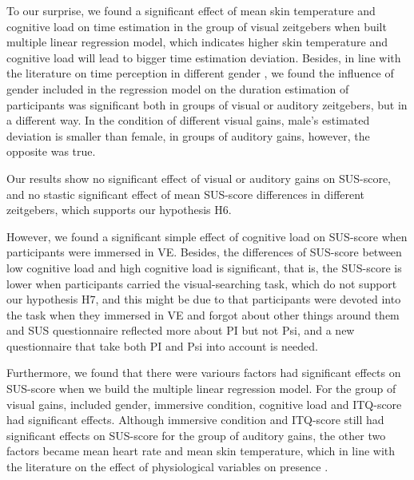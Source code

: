 \documentclass[sigconf]{acmart}
\begin{document}
To our surprise, we found a significant effect of mean skin temperature and cognitive load on time estimation in the group of visual zeitgebers when built multiple linear regression model, which indicates higher skin temperature and cognitive load will lead to bigger time estimation deviation. Besides, in line with the literature on time perception in different gender \cite{hancock1992effect}, we found the influence of gender included in the regression model on the duration estimation of participants was significant both in groups of visual or auditory zeitgebers, but in a different way. In the condition of different visual gains, male's estimated deviation is smaller than female, in groups of auditory gains, however, the opposite was true.

Our results show no significant effect of visual or auditory gains on SUS-score, and no stastic significant effect of mean SUS-score differences in different zeitgebers, which supports our hypothesis H6.

However, we found a significant simple effect of cognitive load on SUS-score when participants were immersed in VE. Besides, the differences of SUS-score between low cognitive load and high cognitive load is significant, that is, the SUS-score is lower when participants carried the visual-searching task, which do not support our hypothesis H7, and this might be due to that participants were devoted into the task when they immersed in VE and forgot about other things around them and SUS questionnaire reflected more about PI but not Psi, and a new questionnaire that take both PI and Psi into account is needed.

Furthermore, we found that there were variours factors had significant effects on SUS-score when we build the multiple linear regression model. For the group of visual gains, included gender, immersive condition, cognitive load and ITQ-score had significant effects. Although immersive condition and ITQ-score still had significant effects on SUS-score for the group of auditory gains, the other two factors became mean heart rate and mean skin temperature, which in line with the literature on the effect of physiological variables on presence \cite{meehan2002physiological,wiederhold2001investigation,sheridan1996further}.


\end{document}
